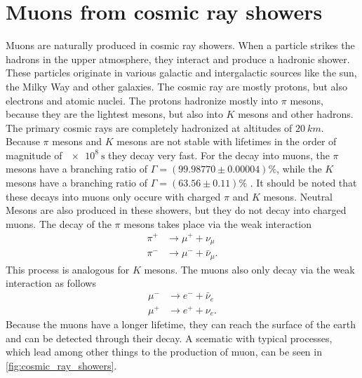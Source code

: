 \section{Muons from cosmic ray showers} 
Muons are naturally produced in cosmic ray showers. When a particle strikes the 
hadrons in the upper atmosphere, they interact and produce a hadronic shower. These particles originate 
in various galactic and intergalactic sources like the sun, the Milky Way and other galaxies. The cosmic 
ray are mostly protons, but also electrons and atomic nuclei. The protons 
hadronize mostly into $\pi$ mesons, because they are the lightest mesons, but also into $K$ mesons 
and other hadrons.
The primary cosmic rays are completely hadronized at altitudes of $\SI{20}{km}$. Because $\pi$ mesons and $K$ mesons are not stable with lifetimes in the order of 
magnitude of $\SI{e8}{\second}$ they decay very fast. For the decay into muons, the $\pi$ mesons have a branching ratio
of $\Gamma = (99.98770\pm{0.00004})\%$, while the $K$ mesons have a branching ratio of $\Gamma = (63.56\pm{0.11})\%$ \cite{pdg}. 
It should be noted that these decays into muons only occure with charged $\pi$ and $K$ mesons. Neutral 
Mesons are also produced in these showers, but they do not decay into charged muons. The decay of the $\pi$ mesons 
takes place via the weak interaction 
\begin{align*}
    \pi^{+} &\to \mu^{+} + \nu_{\mu} \\
    \pi^{-} &\to \mu^{-} + \bar{\nu}_{\mu}.
\end{align*}
This process is analogous for $K$ mesons. The muons also only decay via the weak interaction as follows 
\begin{align*}
    \mu^{-} &\to e^{-} + \bar{\nu}_{e} \\
    \mu^{+} &\to e^{+} + \nu_{e}.
\end{align*}
Because the muons have a longer lifetime, they can reach the surface of the earth and can be detected through their decay. 
A scematic with typical processes, which lead among other things to the production of muon, can be seen in \autoref{fig:cosmic_ray_showers}.
